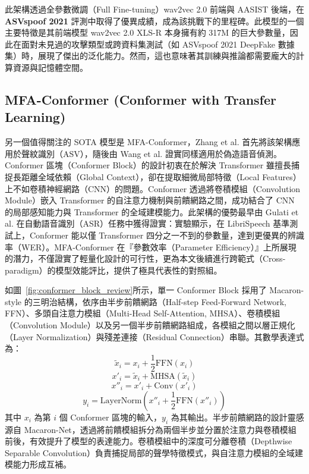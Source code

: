 此架構透過全參數微調（Full Fine-tuning）wav2vec 2.0 前端與 AASIST 後端，在 \textbf{ASVspoof 2021} 評測中取得了優異成績，成為該挑戰下的里程碑。此模型的一個主要特徵是其前端模型 wav2vec 2.0 XLS-R 本身擁有約 317M 的巨大參數量，因此在面對未見過的攻擊類型或跨資料集測試（如 ASVspoof 2021 DeepFake 數據集）時，展現了傑出的泛化能力。然而，這也意味著其訓練與推論都需要龐大的計算資源與記憶體空間。

\subsection{MFA-Conformer (Conformer with Transfer Learning)}

另一個值得關注的 SOTA 模型是 MFA-Conformer，Zhang et al. \cite{zhang2022mfaconformer} 首先將該架構應用於聲紋識別（ASV），隨後由 Wang et al. \cite{wang2023pretraining} 證實同樣適用於偽造語音偵測。Conformer 區塊（Conformer Block）的設計初衷在於解決 Transformer 雖擅長捕捉長距離全域依賴（Global Context），卻在提取細微局部特徵（Local Features）上不如卷積神經網路（CNN）的問題。Conformer 透過將卷積模組（Convolution Module）嵌入 Transformer 的自注意力機制與前饋網路之間，成功結合了 CNN 的局部感知能力與 Transformer 的全域建模能力。此架構的優勢最早由 Gulati et al. \cite{gulati2020conformer} 在自動語音識別（ASR）任務中獲得證實：實驗顯示，在 LibriSpeech 基準測試上，Conformer 能以僅 Transformer 四分之一不到的參數量，達到更優異的辨識率（WER）。MFA-Conformer 在『參數效率（Parameter Efficiency）』上所展現的潛力，不僅證實了輕量化設計的可行性，更為本文後續進行跨範式（Cross-paradigm）的模型效能評比，提供了極具代表性的對照組。

如圖~\ref{fig:conformer_block_review}所示，單一 Conformer Block 採用了 Macaron-style 的三明治結構，依序由半步前饋網路（Half-step Feed-Forward Network, FFN）、多頭自注意力模組（Multi-Head Self-Attention, MHSA）、卷積模組（Convolution Module）以及另一個半步前饋網路組成，各模組之間以層正規化（Layer Normalization）與殘差連接（Residual Connection）串聯。其數學表達式為：
\begin{equation}
\tilde{x}_i = x_i + \frac{1}{2} \text{FFN}(x_i)
\end{equation}
\begin{equation}
x'_i = \tilde{x}_i + \text{MHSA}(\tilde{x}_i)
\end{equation}
\begin{equation}
x''_i = x'_i + \text{Conv}(x'_i)
\end{equation}
\begin{equation}
y_i = \text{LayerNorm}\left(x''_i + \frac{1}{2} \text{FFN}(x''_i)\right)
\end{equation}
其中 $x_i$ 為第 $i$ 個 Conformer 區塊的輸入，$y_i$ 為其輸出。半步前饋網路的設計靈感源自 Macaron-Net，透過將前饋模組拆分為兩個半步並分置於注意力與卷積模組前後，有效提升了模型的表達能力。卷積模組中的深度可分離卷積（Depthwise Separable Convolution）負責捕捉局部的聲學特徵模式，與自注意力模組的全域建模能力形成互補。

